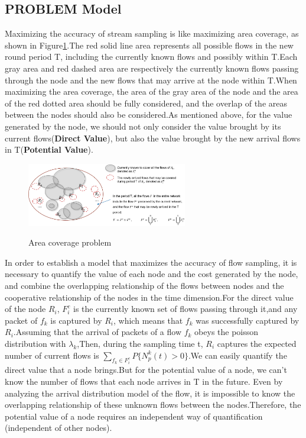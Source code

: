 \documentclass[conference]{IEEEtran}
\begin{document}
\subsection{PROBLEM Model}
Maximizing the accuracy of stream sampling is like maximizing area coverage, as shown in Figure\ref{fig_1_model}.The red solid line area represents all possible flows in the new round period T, including the currently known flows and possibly within T.Each gray area and red dashed area are respectively the currently known flows passing through the node and the new flows that may arrive at the node within T.When maximizing the area coverage, the area of the gray area of the node and the area of the red dotted area should be fully considered, and the overlap of the areas between the nodes should also be considered.As mentioned above, for the value generated by the node, we should not only consider the value brought by its current flows(\textbf{Direct Value}), but also the value brought by the new arrival flows in T(\textbf{Potential Value}).
\begin{figure}[!!!!!!!!!!!!!!hhhhhhhhhht]
\centering

\includegraphics[width=7cm]{images/area_coverage.png}
\label{fig_1_area}

\caption{Area coverage problem}
\label{fig_1_model}
\end{figure}
In order to establish a model that maximizes the accuracy of flow sampling, it is necessary to quantify the value of each node and the cost generated by the node, and combine the overlapping relationship of the flows between nodes and the cooperative relationship of the nodes in the time dimension.For the direct value of the node $R_i$, $F^c_i$ is the currently known set of flows passing through it,and any packet of $f_k$ is captured by $R_i$, which means that $f_k$ was successfully captured by $R_i$.Assuming that the arrival of packets of a flow $f_k$ obeys the poisson distribution with ${\lambda_{k}}$,Then, during the sampling time t, $R_i$ captures the expected number of current flows is $\sum_{f_k \in F^c_i}{P\{N_p^k(t) > 0\}}$.We can easily quantify the direct value that a node brings.But for the potential value of a node, we can't know the number of flows that each node arrives in T in the future. Even by analyzing the arrival distribution model of the flow, it is impossible to know the overlapping relationship of these unknown flows between the nodes.Therefore, the potential value of a node requires an independent way of quantification (independent of other nodes).
\end{document}

